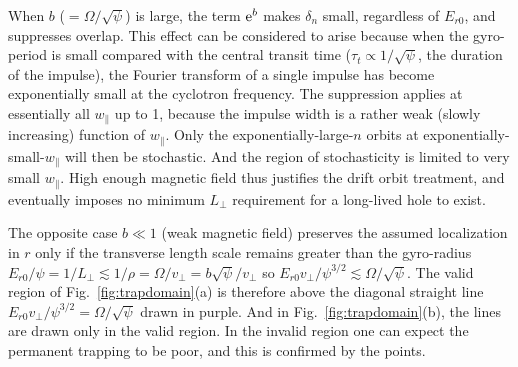 \documentclass{agujournal2019}
\def\wp{w_\parallel}
\begin{document}
When $b$ ($=\Omega/\sqrt\psi$) is large, the term ${\rm e}^b$ makes
$\delta_n$ small, regardless of $E_{r0}$, and suppresses overlap. This
effect can be considered to arise because when the gyro-period is
small compared with the central transit time
($\tau_t\propto 1/\sqrt\psi$, the duration of the impulse), the
Fourier transform of a single impulse has become exponentially small
at the cyclotron frequency. The suppression applies at essentially all
$\wp$ up to 1, because the impulse width is a rather weak (slowly
increasing) function of $\wp$. Only the exponentially-large-$n$ orbits
at exponentially-small-$\wp$ will then be stochastic. And the region
of stochasticity is limited to very small $\wp$. High enough
magnetic field thus justifies the drift orbit treatment, and
eventually imposes no minimum $L_\perp$ requirement for a long-lived
hole to exist.

The opposite case $b\ll 1$ (weak magnetic field) preserves the assumed
localization in $r$ only if the transverse length scale remains
greater than the gyro-radius
$E_{r0}/\psi=1/L_\perp\lesssim
1/\rho=\Omega/v_\perp=b\sqrt\psi/v_\perp$
so $E_{r0}v_\perp/\psi^{3/2} \lesssim \Omega/\sqrt\psi$. The valid
region of Fig.\ \ref{fig:trapdomain}(a) is therefore above the
diagonal straight line $E_{r0}v_\perp/\psi^{3/2}= \Omega/\sqrt\psi$
drawn in purple. And in Fig.\ \ref{fig:trapdomain}(b), the lines are
drawn only in the valid region.  In the invalid region one can
expect the permanent trapping to be poor, and this is confirmed by the
points.
\end{document}

